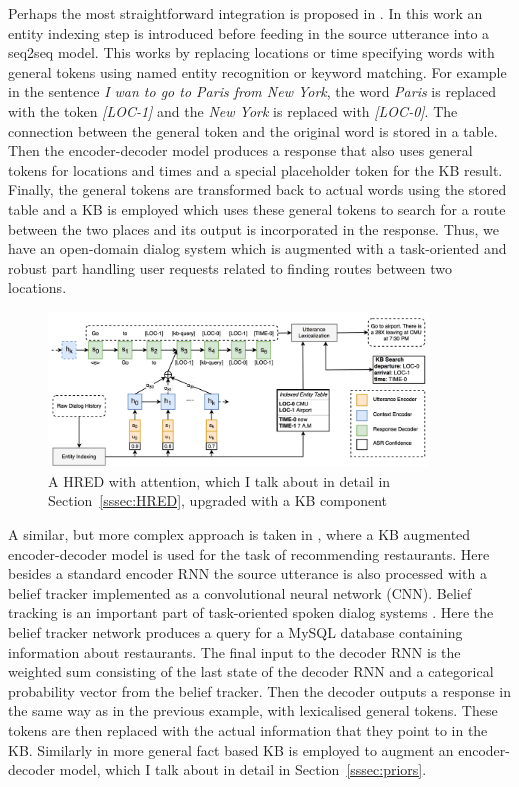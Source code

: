 \documentclass[12pt]{article}
\begin{document}
Perhaps the most straightforward integration is proposed in \cite{Zhao:2017}. In this work an entity indexing step is introduced before feeding in the source utterance into a seq2seq model. This works by replacing locations or time specifying words with general tokens using named entity recognition or keyword matching. For example in the sentence \textit{I wan to go to Paris from New York}, the word \textit{Paris} is replaced with the token \textit{[LOC-1]} and the \textit{New York} is replaced with \textit{[LOC-0]}. The connection between the general token and the original word is stored in a table.  Then the encoder-decoder model produces a response that also uses general tokens for locations and times and a special placeholder token for the KB result. Finally, the general tokens are transformed back to actual words using the stored table and a KB is employed which uses these general tokens to search for a route between the two places and its output is incorporated in the response. Thus, we have an open-domain dialog system which is augmented with a task-oriented and robust part handling user requests related to finding routes between two locations.

\begin{figure}[H]
	\label{fig:KB}
	\centering
	\includegraphics[width=0.9\textwidth]{pics/KB.png}
	\caption{A HRED with attention, which I talk about in detail in Section~\ref{sssec:HRED}, upgraded with a KB component \cite{Zhao:2017}}
\end{figure}

A similar, but more complex approach is taken in \cite{Wen:2016}, where a KB augmented encoder-decoder model is used for the task of recommending restaurants. Here besides a standard encoder RNN the source utterance is also processed with a belief tracker implemented as a convolutional neural network (CNN). Belief tracking is an important part of task-oriented spoken dialog systems \cite{Henderson:2015}. Here the belief tracker network produces a query for a MySQL database containing information about restaurants. The final input to the decoder RNN is the weighted sum consisting of the last state of the decoder RNN and a categorical probability vector from the belief tracker. Then the decoder outputs a response in the same way as in the previous example, with lexicalised general tokens. These tokens are then replaced with the actual information that they point to in the KB. Similarly in \cite{Ghazvininejad:2017} more general fact based KB is employed to augment an encoder-decoder model, which I talk about in detail in Section~\ref{sssec:priors}.
\end{document}
